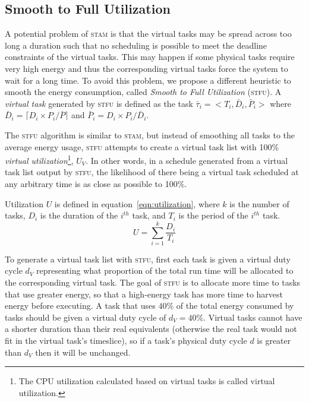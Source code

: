 \subsection{Smooth to Full Utilization}

A potential problem of \textsc{stam} is that the virtual tasks may be spread across too long a duration such that no scheduling is possible to meet the deadline constraints of the virtual tasks. This may happen if some physical tasks require very high energy and thus the corresponding virtual tasks force the system to wait for a long time. To avoid this problem, we propose a different heuristic to smooth the energy consumption, called \emph{Smooth to Full Utilization} (\textsc{stfu}).  A \emph{virtual task} generated by \textsc{stfu} is defined as the task $\bar{\tau}_i = <T_i, \bar{D}_i, \bar{P}_i>$ where $\bar{D}_i = \lceil D_i \times  P_i / \bar{P} \rceil$ and $\bar{P}_i = D_i \times  P_i / \bar{D}_i$.

The \textsc{stfu} algorithm is similar to \textsc{stam}, but instead of smoothing all tasks to the average energy usage, \textsc{stfu} attempts to create a virtual task list with 100\% \emph{virtual utilization}\footnote{The CPU utilization calculated based on virtual tasks is called virtual utilization.}, $U_V$.  In other words, in a schedule generated from a virtual task list output by \textsc{stfu}, the likelihood of there being a virtual task scheduled at any arbitrary time is as close as possible to 100\%.

Utilization $U$ is defined in equation~\ref{eqn:utilization}, where $k$ is the number of tasks, $D_i$ is the duration of the $i^{th}$ task, and $T_i$ is the period of the $i^{th}$ task.
\begin{equation}
\label{eqn:utilization}
U = \sum_{i=1}^{k} \frac{D_i}{T_i}
\end{equation}

To generate a virtual task list with \textsc{stfu}, first each task is given a virtual duty cycle $d_V$ representing what proportion of the total run time will be allocated to the corresponding virtual task.  The goal of \textsc{stfu} is to allocate more time to tasks that use greater energy, so that a high-energy task has more time to harvest energy before executing.  A task that uses $40\%$ of the total energy consumed by tasks should be given a virtual duty cycle of $d_V=40\%$.  Virtual tasks cannot have a shorter duration than their real equivalents (otherwise the real task would not fit in the virtual task's timeslice), so if a task's physical duty cycle $d$ is greater than $d_V$ then it will be unchanged.

